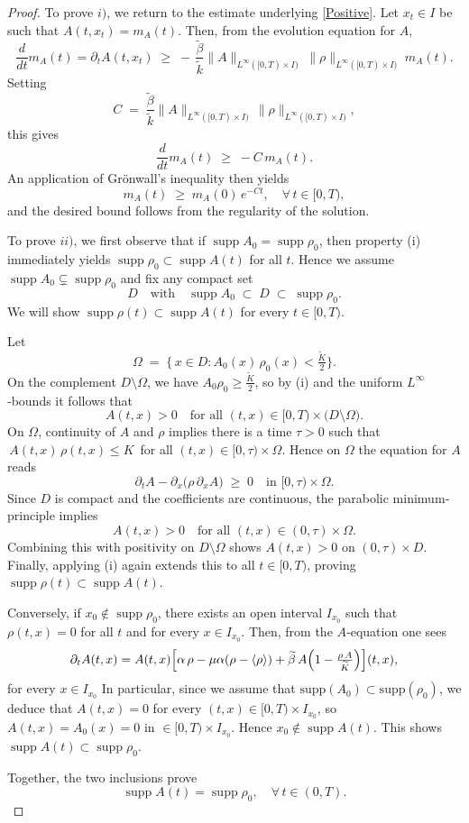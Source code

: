 \documentclass[12pt]{amsart}
\begin{document}
\begin{proof}
  To prove $i)$, we return to the estimate underlying \eqref{Positive}. Let $x_t\in I$ be such that $A(t,x_t)=m_A(t)$. Then, from the evolution equation for $A$,
\[
\frac{d}{dt}m_A(t)
=\partial_t A(t,x_t)
\;\ge\;
-\,\frac{\tilde \beta}{
\tilde k} \|A\|_{L^\infty([0,T)\times I)}\;\|\rho\|_{L^\infty([0,T)\times I)}\;m_A(t).
\]
Setting 
\[
C \;=\;\frac{\tilde \beta}{
\tilde k} \|A\|_{L^\infty([0,T)\times I)}\,\|\rho\|_{L^\infty([0,T)\times I)},
\]
this gives
\[
\frac{d}{dt}m_A(t)\;\ge\;-C\,m_A(t).
\]
An application of Grönwall’s inequality then yields
\[
m_A(t)\;\ge\;m_A(0)\,e^{-Ct},
\quad
\forall\,t\in[0,T),
\]
and the desired bound follows from the regularity of the solution.  

To prove $ii)$, we first observe that if 
$\operatorname{supp}A_{0}=\operatorname{supp}\rho_{0}$, 
then property (i) immediately yields 
$\operatorname{supp}\rho_{0}\subset \operatorname{supp}A(t)$ for all $t$.  
Hence we assume 
$\operatorname{supp}A_{0}\subsetneq\operatorname{supp}\rho_{0}$ 
and fix any compact set 
\[
D\quad\text{with}\quad
\operatorname{supp}A_{0}\;\subset\;D\;\subset\;\operatorname{supp}\rho_{0}.
\]
We will show 
$\operatorname{supp}\rho(t)\subset\operatorname{supp}A(t)$ 
for every $t\in[0,T)$.  

Let 
\[
\Omega \;=\;\bigl\{\,x\in D : A_{0}(x)\,\rho_{0}(x)<\tfrac{\widetilde K}{2}\bigr\}.
\]
On the complement $D\setminus\Omega$, we have $A_{0}\rho_{0}\ge\tfrac{\widetilde K}{2}$, so by (i) and the uniform $L^\infty$‐bounds it follows that  
\[
A(t,x)>0
\quad\text{for all }(t,x)\in[0,T)\times\bigl(D\setminus\Omega\bigr).
\]
On $\Omega$, continuity of $A$ and $\rho$ implies there is a time $\tau>0$ such that 
$\,A(t,x)\,\rho(t,x)\le K$\,
for all $(t,x)\in[0,\tau)\times\Omega$.  Hence on $\Omega$ the equation for $A$ reads
\[
\partial_{t}A-\partial_{x}\bigl(\rho\,\partial_{x}A\bigr)\;\ge\;0
\quad\text{in }[0,\tau)\times\Omega.
\]
Since $D$  is compact and the coefficients are continuous, the parabolic minimum‐principle implies 
\[
A(t,x)>0
\quad\text{for all }(t,x)\in(0,\tau)\times\Omega.
\]
Combining this with positivity on $D\setminus\Omega$ shows 
$A(t,x)>0$ on $(0,\tau)\times D$.  Finally, applying (i) again extends this to all $t\in[0,T)$, proving 
$\operatorname{supp}\rho(t)\subset\operatorname{supp}A(t)$.  

Conversely, if $x_{0}\notin\operatorname{supp}\rho_{0}$, there exists an open interval $I_{x_0}$ such that $\rho(t,x)=0$ for all $t$ and for every $x\in I_{x_0}$. Then, from the $A$‐equation one sees
\[
\partial_{t}A(t,x)
= A(t,x)\Bigl[\alpha\,\rho-\mu\alpha(\rho-\langle\rho\rangle)
+\widetilde\beta\,A\Bigl(1-\tfrac{\rho\,A}{\widetilde K}\Bigr)\Bigr](t,x),
\]
for every $x\in I_{x_0}$
In particular, since we assume that $\text{supp}(A_0)\subset \text{supp}(\rho_0)$, we  deduce that $A(t,x)=0$ for every  $(t,x)\in[0,T)\times I_{x_0}$, so $A(t,x)=A_{0}(x)=0$ in $\in[0,T)\times I_{x_0}$.  Hence $x_{0}\notin\operatorname{supp}A(t)$.  This shows 
$\operatorname{supp}A(t)\subset\operatorname{supp}\rho_{0}$.  

Together, the two inclusions prove  
\[
\operatorname{supp}A(t)=\operatorname{supp}\rho_{0},
\quad
\forall\,t\in(0,T).
\]
\end{proof}




\end{document}
